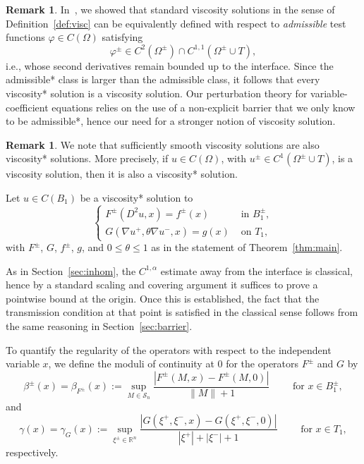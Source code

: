 \documentclass[letter,11pt]{amsart}
\newcommand{\R}{\mathbb{R}}
\newcommand{\scal}{\mathcal{S}}
\theoremstyle{definition}
\newtheorem{rem}[thm]{Remark}
\numberwithin{equation}{section}
\begin{document}
\begin{rem}
In~\cite{E}, we showed that standard viscosity solutions in the sense of Definition~\ref{def:visc} can be equivalently defined with respect to \emph{admissible} test functions $\varphi \in C(\Omega)$ satisfying
\[
\varphi^{\pm} \in C^{2}(\Omega^{\pm}) \cap C^{1,1}(\Omega^{\pm} \cup T),
\]
i.e., whose second derivatives remain bounded up to the interface.
Since the admissible* class is larger than the admissible class, it follows that every viscosity* solution is a viscosity solution.
Our perturbation theory for variable-coefficient equations relies on the use of a non-explicit barrier that we only know to be admissible*, hence our need for a stronger notion of viscosity solution.
\end{rem}

\begin{rem}
We note that sufficiently smooth viscosity solutions are also viscosity* solutions. 
More precisely, if $u \in C(\Omega)$, with $u^{\pm} \in C^{1}(\Omega^{\pm} \cup T)$, is a viscosity solution, then it is also a viscosity* solution.
\end{rem}

\medskip

Let $u \in C(B_1)$ be a viscosity* solution to 
\begin{equation}
\label{calarca}
\begin{cases}
F^{\pm}(D^2 u, x) = f^{\pm}(x) & \text{ in } B_1^{\pm},\\
G(\nabla u^{+}, \theta \nabla u^{-}, x) = g(x) & \text{ on } T_1,
\end{cases}
\end{equation}
with $F^{\pm}$, $G$, $f^{\pm}$, $g$, and $0 \leq \theta \leq 1$ as in the statement of Theorem~\ref{thm:main}.

\medskip

As in Section~\ref{sec:inhom}, the $C^{1,\alpha}$ estimate away from the interface is classical, hence by a standard scaling and covering argument it suffices to prove a pointwise bound at the origin.
Once this is established, the fact that the transmission condition at that point is satisfied in the classical sense follows from the same reasoning in Section~\ref{sec:barrier}.

\medskip

To quantify the regularity of the operators with respect to the independent variable $x$, we define the moduli of continuity at $0$ for the operators $F^{\pm}$ and $G$ by
\[
\beta^{\pm}(x) = \beta_{F^{\pm}}(x) := \sup_{M \in \scal_{n}} \frac{|F^{\pm}(M, x) - F^{\pm}(M,0)|}{\|M\| + 1}
\qquad \text{ for } x \in B_1^{\pm},
\]
and
\[
\gamma(x) = \gamma_{G}(x) 
:= \sup_{\xi^{\pm} \in \R^{n}} \frac{|G(\xi^{+}, \xi^{-}, x) - G(\xi^{+}, \xi^{-}, 0)|}{|\xi^{+}| + |\xi^{-}| + 1}
\qquad \text{ for } x \in T_1,
\]
respectively.
\end{document}
